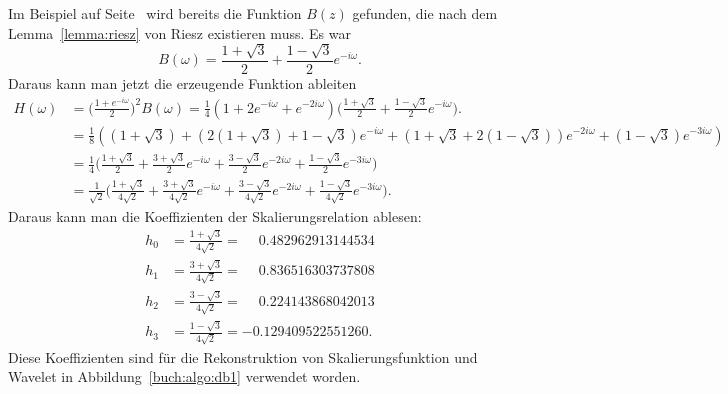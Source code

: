 Im Beispiel auf Seite~\pageref{buch:kompakt:db2riesz} wird bereits
die Funktion $B(z)$ gefunden, die nach dem Lemma~\ref{lemma:riesz}
von Riesz existieren muss.
Es war
\[
B(\omega)
=
\frac{1+\sqrt{3}}2 + \frac{1-\sqrt{3}}2e^{-i\omega}.
\]
Daraus kann man jetzt die erzeugende Funktion ableiten
\begin{align*}
H(\omega)
&=
\biggl(\frac{1+e^{-i\omega}}2\biggr)^2 B(\omega)
=
\frac14(1+2e^{-i\omega}+e^{-2i\omega})
\biggl(
\frac{1+\sqrt{3}}2 + \frac{1-\sqrt{3}}2e^{-i\omega}
\biggr).
\\
&=
\frac18(
(1+\sqrt{3})
+
(2(1+\sqrt{3})+1-\sqrt{3}) e^{-i\omega}
+
(1+\sqrt{3}+2(1-\sqrt{3})) e^{-2i\omega}
+
(1-\sqrt{3})e^{-3i\omega}
)
\\
&=
\frac14\biggl(
\frac{1+\sqrt{3}}2
+
\frac{3+\sqrt{3}}2 e^{-i\omega}
+
\frac{3-\sqrt{3}}2 e^{-2i\omega}
+
\frac{1-\sqrt{3}}2 e^{-3i\omega}
\biggr)
\\
&=
\frac1{\sqrt{2}}
\biggl(
\frac{1+\sqrt{3}}{4\sqrt{2}}
+
\frac{3+\sqrt{3}}{4\sqrt{2}} e^{-i\omega}
+
\frac{3-\sqrt{3}}{4\sqrt{2}} e^{-2i\omega}
+
\frac{1-\sqrt{3}}{4\sqrt{2}} e^{-3i\omega}
\biggr).
\end{align*}
Daraus kann man die Koeffizienten der Skalierungsrelation ablesen:
\begin{align*}
h_0
&=
\frac{1+\sqrt{3}}{4\sqrt{2}}
=
\phantom{-}
0.482962913144534
\\
h_1
&=
\frac{3+\sqrt{3}}{4\sqrt{2}}
=
\phantom{-}
0.836516303737808
\\
h_2
&=
\frac{3-\sqrt{3}}{4\sqrt{2}}
=
\phantom{-}
0.224143868042013
\\
h_3
&=
\frac{1-\sqrt{3}}{4\sqrt{2}}
=
-0.129409522551260.
\end{align*}
Diese Koeffizienten sind für die Rekonstruktion von
Skalierungsfunktion und Wavelet in Abbildung~\ref{buch:algo:db1}
verwendet worden.

